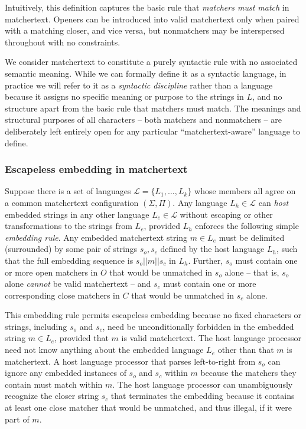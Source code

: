 Intuitively, this definition captures the basic rule
that \emph{matchers must match} in matchertext.
Openers can be introduced into valid matchertext
only when paired with a matching closer, and vice versa,
but nonmatchers may be interspersed throughout with no constraints.

We consider matchertext to constitute a purely syntactic rule
with no associated semantic meaning.
While we can formally define it as a syntactic language,
in practice we will refer to it as a \emph{syntactic discipline}
rather than a language
because it assigns no specific meaning or purpose to the strings in $L$,
and no structure apart from the basic rule that matchers must match.
The meanings and structural purposes of all characters --
both matchers and nonmatchers --
are deliberately left entirely open
for any particular ``matchertext-aware'' language to define.


\subsubsection{Escapeless embedding in matchertext}
\label{sec:design:abstract:embed}

Suppose there is a set of languages $\mathcal{L} = \{L_1,\dots,L_k\}$
whose members all agree on a common  matchertext configuration $(\Sigma,\Pi)$.
Any language $L_h \in \mathcal{L}$ can \emph{host}
embedded strings in any other language $L_e \in \mathcal{L}$
without escaping or other transformations to the strings from $L_e$,
provided $L_h$ enforces the following simple \emph{embedding rule}.
Any embedded matchertext string $m \in L_e$ 
must be delimited (surrounded) by
some pair of strings $s_o, s_c$ defined by the host language $L_h$,
such that the full embedding sequence is $s_o || m || s_c$ in $L_h$.
Further, $s_o$ must contain one or more open matchers in $O$
that would be unmatched in $s_o$ alone --
that is, $s_o$ alone \emph{cannot} be valid matchertext --
and $s_c$ must contain one or more corresponding close matchers in $C$
that would be unmatched in $s_c$ alone.

This embedding rule permits escapeless embedding
because no fixed characters or strings, including $s_o$ and $s_c$,
need be unconditionally forbidden in the embedded string $m \in L_e$,
provided that $m$ is valid matchertext.
The host language processor need not know anything
about the embedded language $L_e$ other than that $m$ is matchertext.
A host language processor that parses left-to-right from $s_o$
can ignore any embedded instances of $s_o$ and $s_c$ within $m$
because the matchers they contain must match within $m$.
The host language processor can unambiguously recognize
the closer string $s_c$ that terminates the embedding
because it contains at least one close matcher
that would be unmatched, and thus illegal, if it were part of $m$.

